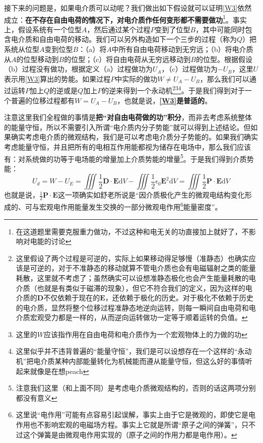 \documentclass{ctexart}
\begin{document}
	接下来的问题是，如果电介质可以动呢？我们做出如下假设就可以证明\eqref{W3}依然成立：\textbf{在不存在自由电荷的情况下，对电介质作任何变形都不需要做功}\footnote{在这道题里需要克服重力做功，不过这种和电无关的功直接加上就好了，不影响对电能的讨论}。事实上，假设系统有一个位型$A$，然后通过某个过程$P$变到了位型$B$，其中可能同时包含电介质和自由电荷的移动。我们可以另外构造如下一个三步的过程（称为$Q$）把系统从位型$A$变到位型$B$：（a）将$A$中所有自由电荷移动到无穷远；（b）将电介质从$A$的位型移动到$B$的位型；（c）将自由电荷从无穷远移动到$B$的位型。根据假设（b）过程没有做功，根据定义（a）过程做功为$U_A$，（c）过程做功为$-U_B$，这里$U$表示用\eqref{W3}算出的势能。如果过程$P$中实际的做功$W\neq U_A-U_B$，那么我们可以通过运转$P$加上$Q$的逆或是$Q$加上$P$的逆来得到一个永动机\footnote{这里假设了两个过程是可逆的，实际上如果移动得足够慢（准静态）也确实应该是可逆的，对于不准静态的移动就算不管电介质也会有电磁辐射之类的能量耗散，这里就不考虑了；虽然确实可以设想准静态极化也会产生能量耗散的电介质（也就是有类似于磁滞的现象），但它不符合我们的定义，因为这样的电介质的$\mathbf D$不仅依赖于现在的$\mathbf E$，还依赖于极化的历史。对于极化不依赖于历史的电介质，显然将整个位移过程准静态地逆向运转，则每一瞬间自由电荷和电介质宏观受力都是一样的，从而逆向运转做功一定等于顺着运转的负值。}\footnote{这里的$W$应该指作用在自由电荷和电介质作为一个宏观物体上的力做的功}\footnote{这里似乎并不违背普遍的“能量守恒”，我们是可以设想存在一个这样的“永动机”把电介质某种内部能量转化为机械能而遵从能量守恒，但这么好的事情听起来就像是在想peach}。于是我们得到对于一个普遍的位移过程都有$W=U_A-U_B$，也就是说，\textbf{\eqref{W3}是普适的}。
	
	注意这里我们全程做的事情是\textbf{把“对自由电荷做的功”积分}，而非去考虑系统整体的能量守恒，所以不需要引入所谓“电介质内分子势能”就可以得到上述结论。但如果确实考虑电介质的微观结构，我们是可以考虑电介质分子势能的。如果我们确实考虑能量守恒，并且把所有的电相互作用能都视为储存在电场中，那么我们应该有：对系统做的功等于电场能的增量加上介质势能的增量\footnote{注意我们这里（和上面不同）是考虑电介质微观结构的，否则的话这两项分别都没有意义}。于是我们得到介质势能：
	\begin{equation}
	U_{d}=W-U_{E}=\iiint\frac{1}{2}\mathbf D\cdot\mathbf E\mathrm dV-\iiint\frac{1}{2}\epsilon_0\mathbf E^2\mathrm dV=\iiint\frac{1}{2}\mathbf P\cdot\mathbf E\mathrm dV
	\end{equation}
	也就是说，$\frac{1}{2}\mathbf P\cdot\mathbf E$这一项确实如舒老所说是“因介质极化产生的微观电结构变化形成的、可与宏观电作用能量发生交换的一部分微观电作用\footnote{这里说“电作用”可能有点容易引起误解，事实上由于它是微观的，即使它是电作用也不影响宏观的电磁场方程。事实上它就是所谓“原子之间的弹簧”，只不过这个弹簧是由微观电作用实现的（原子之间的作用力都是电作用）。}能量密度”。
	
\end{document}
